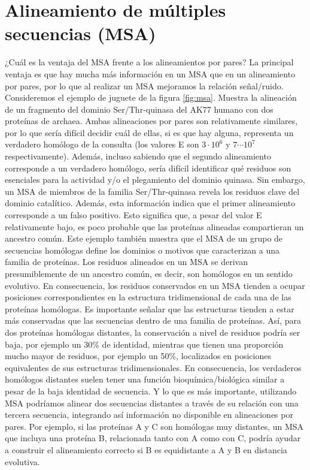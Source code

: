 \chapter{Alineamiento de múltiples secuencias (MSA)}
¿Cuál es la ventaja del MSA frente a los alineamientos por pares? La principal ventaja es que hay mucha más información en un MSA que en un alineamiento por pares, por lo que al realizar un MSA mejoramos la relación señal/ruido. Consideremos el ejemplo de juguete de la figura \ref{fig:msa}. Muestra la alineación de un fragmento del dominio Ser/Thr-quinasa del AK77 humano con dos proteínas de archaea. Ambas alineaciones por pares son relativamente similares, por lo que sería difícil decidir cuál de ellas, si es que hay alguna, representa un verdadero homólogo de la consulta (los valores E son $3 \cdot 10^6$ y $7 \cdots 10^7$ respectivamente). Además, incluso sabiendo que el segundo alineamiento corresponde a un verdadero homólogo, sería difícil identificar qué residuos son esenciales para la actividad y/o el plegamiento del dominio quinasa. Sin embargo, un MSA de miembros de la familia Ser/Thr-quinasa revela los residuos clave del dominio catalítico. Además, esta información indica que el primer alineamiento corresponde a un falso positivo. Esto significa que, a pesar del valor E relativamente bajo, es poco probable que las proteínas alineadas compartieran un ancestro común. Este ejemplo también muestra que el MSA de un grupo de secuencias homólogas define los dominios o motivos que caracterizan a una familia de proteínas. Los residuos alineados en un MSA se derivan presumiblemente de un ancestro común, es decir, son homólogos en un sentido evolutivo. En consecuencia, los residuos conservados en un MSA tienden a ocupar posiciones correspondientes en la estructura tridimensional de cada una de las proteínas homólogas. Es importante señalar que las estructuras tienden a estar más conservadas que las secuencias dentro de una familia de proteínas. Así, para dos proteínas homólogas distantes, la conservación a nivel de residuos podría ser baja, por ejemplo un 30\% de identidad, mientras que tienen una proporción mucho mayor de residuos, por ejemplo un 50\%, localizados en posiciones equivalentes de sus estructuras tridimensionales. En consecuencia, los verdaderos homólogos distantes suelen tener una función bioquímica/biológica similar a pesar de la baja identidad de secuencia. Y lo que es más importante, utilizando MSA podríamos alinear dos secuencias distantes a través de su relación con una tercera secuencia, integrando así información no disponible en alineaciones por pares. Por ejemplo, si las proteínas A y C son homólogas muy distantes, un MSA que incluya una proteína B, relacionada tanto con A como con C, podría ayudar a construir el alineamiento correcto si B es equidistante a A y B en distancia evolutiva.

